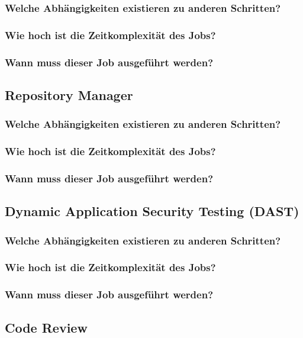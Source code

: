 \subsubsection{Welche Abhängigkeiten existieren zu anderen Schritten?}
\subsubsection{Wie hoch ist die Zeitkomplexität des Jobs?}
\subsubsection{Wann muss dieser Job ausgeführt werden?}

\subsection{Repository Manager}
\subsubsection{Welche Abhängigkeiten existieren zu anderen Schritten?}
\subsubsection{Wie hoch ist die Zeitkomplexität des Jobs?}
\subsubsection{Wann muss dieser Job ausgeführt werden?}

\subsection{Dynamic Application Security Testing (DAST)}
\subsubsection{Welche Abhängigkeiten existieren zu anderen Schritten?}
\subsubsection{Wie hoch ist die Zeitkomplexität des Jobs?}
\subsubsection{Wann muss dieser Job ausgeführt werden?}

\subsection{Code Review}
